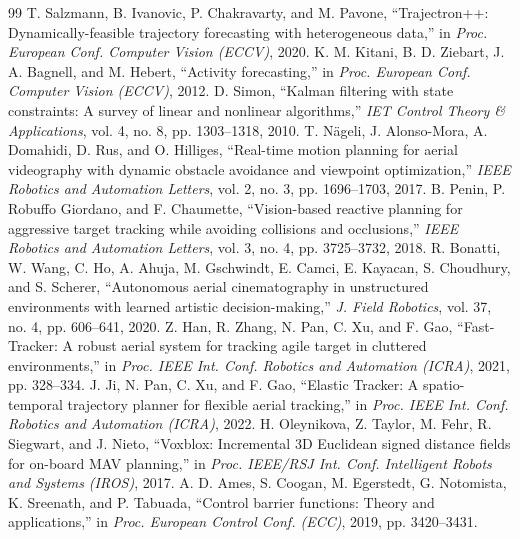 \documentclass[12pt,a4paper]{article}
\begin{document}
\begin{thebibliography}{99}
 T. Salzmann, B. Ivanovic, P. Chakravarty, and M. Pavone, ``Trajectron++: Dynamically-feasible trajectory forecasting with heterogeneous data,'' in \emph{Proc. European Conf. Computer Vision (ECCV)}, 2020.
 K. M. Kitani, B. D. Ziebart, J. A. Bagnell, and M. Hebert, ``Activity forecasting,'' in \emph{Proc. European Conf. Computer Vision (ECCV)}, 2012.
 D. Simon, ``Kalman filtering with state constraints: A survey of linear and nonlinear algorithms,'' \emph{IET Control Theory \& Applications}, vol. 4, no. 8, pp. 1303–1318, 2010.
 T. Nägeli, J. Alonso-Mora, A. Domahidi, D. Rus, and O. Hilliges, ``Real-time motion planning for aerial videography with dynamic obstacle avoidance and viewpoint optimization,'' \emph{IEEE Robotics and Automation Letters}, vol. 2, no. 3, pp. 1696–1703, 2017.
 B. Penin, P. Robuffo Giordano, and F. Chaumette, ``Vision-based reactive planning for aggressive target tracking while avoiding collisions and occlusions,'' \emph{IEEE Robotics and Automation Letters}, vol. 3, no. 4, pp. 3725–3732, 2018.
 R. Bonatti, W. Wang, C. Ho, A. Ahuja, M. Gschwindt, E. Camci, E. Kayacan, S. Choudhury, and S. Scherer, ``Autonomous aerial cinematography in unstructured environments with learned artistic decision-making,'' \emph{J. Field Robotics}, vol. 37, no. 4, pp. 606–641, 2020.
 Z. Han, R. Zhang, N. Pan, C. Xu, and F. Gao, ``Fast-Tracker: A robust aerial system for tracking agile target in cluttered environments,'' in \emph{Proc. IEEE Int. Conf. Robotics and Automation (ICRA)}, 2021, pp. 328–334.
 J. Ji, N. Pan, C. Xu, and F. Gao, ``Elastic Tracker: A spatio-temporal trajectory planner for flexible aerial tracking,'' in \emph{Proc. IEEE Int. Conf. Robotics and Automation (ICRA)}, 2022.
 H. Oleynikova, Z. Taylor, M. Fehr, R. Siegwart, and J. Nieto, ``Voxblox: Incremental 3D Euclidean signed distance fields for on-board MAV planning,'' in \emph{Proc. IEEE/RSJ Int. Conf. Intelligent Robots and Systems (IROS)}, 2017.
 A. D. Ames, S. Coogan, M. Egerstedt, G. Notomista, K. Sreenath, and P. Tabuada, ``Control barrier functions: Theory and applications,'' in \emph{Proc. European Control Conf. (ECC)}, 2019, pp. 3420–3431.
\end{thebibliography}
\end{document}
